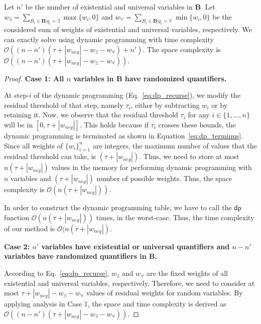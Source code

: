 	
	
	
		
		\begin{lemmarep}
			Let $ n' $ be the number of existential and universal variables in $ \mathbf{B} $. Let $ w_{\exists} = \sum_{B_i \in \mathbf{B} | q_i = \exists} \max\{w_i, 0\}$  and $ w_{\forall} = \sum_{B_i \in \mathbf{B} | q_i = \forall} \min\{w_i, 0\}$ be the considered sum of weights of existential and universal variables, respectively. We can exactly solve {\stochastic} using dynamic programming with time complexity $ \mathcal{O}((n - n')(\tau + |w_{neg}| - w_{\exists} - w_{\forall}) + n') $. The space complexity is  $ \mathcal{O}((n - n')(\tau + |w_{neg}| - w_{\exists} - w_{\forall})) $.
		\end{lemmarep}
	
		\begin{proof}
			\textbf{Case 1: All $n$ variables in $\mathbf{B}$ have randomized quantifiers.}
			
			At step-$i$ of the dynamic programming (Eq.~\eqref{eq:dp_recurse}), we modify the residual threshold of that step, namely $\tau_i$, either by subtracting $w_i$ or by retaining it.
			Now, we observe that the residual threshold $\tau_i$ for any $i \in \lbrace1,\ldots,n\rbrace$ will be in $[0, \tau+|w_{neg}|]$. This holds because if $\tau_i$ crosses these bounds, the dynamic programming is terminated as shown in Equation~\eqref{eq:dp_terminus}.
			Since all weights of $\{w_i\}_{i=1}^{n}$ are integers, the maximum number of values that the residual threshold can take, is $ (\tau + |w_{neg}|) $.
			Thus, we need to store at most $ n(\tau + |w_{neg}|)$ values in the memory for performing dynamic programming with $n$ variables and $ (\tau + |w_{neg}|) $ number of possible weights.
			Thus, the space complexity  is $ \mathcal{O}(n(\tau + |w_{neg}|)) $.  
			
			In order to construct the dynamic programming table, we have to call the $\mathsf{dp}$ function $ \mathcal{O}(n(\tau + |w_{neg}|)) $ times, in the worst-case.
			Thus, the time complexity of our method is $ \mathcal{O}(n(\tau + |w_{neg}|) $.
			
			
			\textbf{Case 2: $n'$ variables have existential or universal quantifiers and $n-n'$ variables have randomized quantifiers in $\mathbf{B}$.}

			According to Eq.~\eqref{eq:dp_recurse}, $ w_\exists $ and $ w_\forall $ are the fixed weights of all existential and universal variables, respectively. Therefore, we need to consider at most $ \tau + |w_{neg}| -  w_\exists - w_\forall $ values of residual weights for random variables. By applying analysis in Case 1, the space and time complexity is derived as $ \mathcal{O}((n - n')(\tau + |w_{neg}| - w_{\exists} - w_{\forall})) $. 
			

\end{proof}
